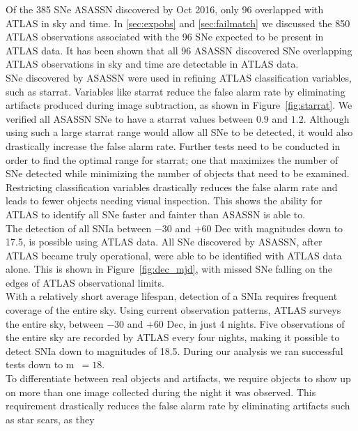 \documentclass[aps,prb,twocolumn,superscriptaddress]{revtex4-1}
\begin{document}
\indent Of the 385 SNe ASASSN discovered by Oct 2016, only 96 overlapped
with ATLAS in sky and time.  
In \cref{sec:expobs} and \cref{sec:failmatch} we discussed the 850 
ATLAS observations associated with the 96 SNe expected to be 
present in ATLAS data.  
It has been shown that all 96 ASASSN discovered SNe overlapping ATLAS 
observations in sky and time are detectable in ATLAS data.\\
%
\indent SNe discovered by ASASSN were used in refining ATLAS classification 
variables, such as starrat.  Variables like starrat reduce the 
false alarm rate by eliminating artifacts produced during image 
subtraction, as shown in Figure~\ref{fig:starrat}.  We verified all ASASSN 
SNe to have a starrat values between $0.9$ and $1.2$.  
Although using such a large starrat range would allow all SNe to be detected, 
it would also drastically increase the false alarm rate.  Further tests need 
to be conducted in order to find the optimal range for starrat; one that maximizes 
the number of SNe detected while minimizing the number of objects that need to be examined.  
Restricting classification variables drastically reduces the false alarm rate and leads 
to fewer objects needing visual inspection. This shows the ability 
for ATLAS to identify all SNe faster and fainter than ASASSN is able to.\\
%
\indent The detection of all SNIa between $-30$ and $+60$ Dec with 
magnitudes down to 17.5, is possible using ATLAS data.  
All SNe discovered by ASASSN, after ATLAS became truly operational, were 
able to be identified with ATLAS data alone.  This is shown in 
Figure~\ref{fig:dec_mjd}, with missed SNe falling on the edges of ATLAS 
observational limits.\\
%
\indent With a relatively short average lifespan, detection of a SNIa requires 
frequent coverage of the entire sky. Using current observation patterns,
ATLAS surveys the entire sky, between $-30$ and $+60$ Dec, in just 4 nights. 
Five observations of the entire sky are recorded by ATLAS every four nights, 
making it possible to detect SNIa down to magnitudes of 18.5.  During our analysis 
we ran successful tests down to m~$=18$.\\
%
\indent To differentiate between real objects 
and artifacts, we require objects to show up on 
more than one image collected during the night it was observed.  
This requirement drastically reduces the false alarm rate by 
eliminating artifacts such as star scars, as they 
\end{document}
